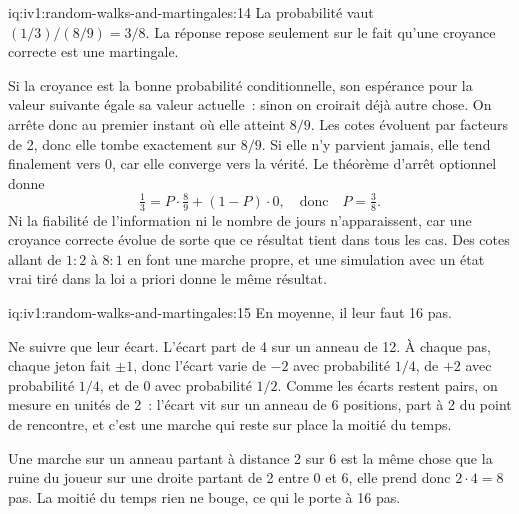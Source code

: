 \begin{solution}{iq:iv1:random-walks-and-martingales:14}
La probabilité vaut $(1/3)/(8/9) = 3/8$. La réponse repose seulement sur le fait qu'une croyance correcte est une martingale.

Si la croyance est la bonne probabilité conditionnelle, son espérance pour la valeur suivante égale sa valeur actuelle~: sinon on croirait déjà autre chose. On arrête donc au premier instant où elle atteint $8/9$. Les cotes évoluent par facteurs de 2, donc elle tombe exactement sur $8/9$. Si elle n'y parvient jamais, elle tend finalement vers 0, car elle converge vers la vérité. Le théorème d'arrêt optionnel donne
\[
\tfrac13 = P \cdot \tfrac89 + (1 - P) \cdot 0, \quad\text{donc}\quad P = \tfrac38.
\]
Ni la fiabilité de l'information ni le nombre de jours n'apparaissent, car une croyance correcte évolue de sorte que ce résultat tient dans tous les cas. Des cotes allant de $1 : 2$ à $8 : 1$ en font une marche propre, et une simulation avec un état vrai tiré dans la loi a priori donne le même résultat.

\end{solution}

\begin{solution}{iq:iv1:random-walks-and-martingales:15}
En moyenne, il leur faut 16 pas.

Ne suivre que leur écart. L'écart part de 4 sur un anneau de 12. À chaque pas, chaque jeton fait $\pm 1$, donc l'écart varie de $-2$ avec probabilité $1/4$, de $+2$ avec probabilité $1/4$, et de 0 avec probabilité $1/2$. Comme les écarts restent pairs, on mesure en unités de 2~: l'écart vit sur un anneau de 6 positions, part à 2 du point de rencontre, et c'est une marche qui reste sur place la moitié du temps.

Une marche sur un anneau partant à distance 2 sur 6 est la même chose que la ruine du joueur sur une droite partant de 2 entre 0 et 6, elle prend donc $2 \cdot 4 = 8$ pas. La moitié du temps rien ne bouge, ce qui le porte à 16 pas.

\end{solution}

